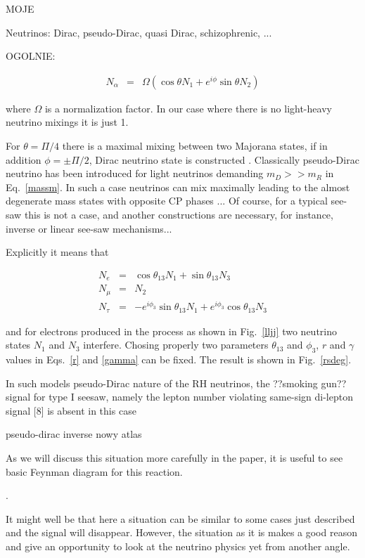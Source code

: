 \documentclass[twocolumn,superscriptaddress,showpacs,prl,nofootinbib,floatfix]{revtex4}
\begin{document}
MOJE

  Neutrinos: Dirac, pseudo-Dirac, quasi Dirac, schizophrenic, ... 
 
OGOLNIE: 
 
\begin{eqnarray}
N_\alpha &=& \Omega (\cos\theta N_1 +e^{i \phi} \sin\theta N_2 )  
\end{eqnarray} 

where $\Omega$ is a normalization factor. In our case where there is no light-heavy neutrino mixings  it is just 1.  
 
For $\theta = \Pi/4$ there is a maximal mixing between two Majorana states, if in addition $\phi = \pm \Pi/2$, Dirac neutrino state is constructed  \cite{Bilenky:1987ty}. Classically pseudo-Dirac neutrino has been introduced for light neutrinos demanding $m_D>> m_R$ in Eq.~\ref{massm}. In such a case neutrinos can mix maximally leading to the almost degenerate mass states  with opposite CP phases ...
Of course, for a typical see-saw this is not a case, and  another constructions are necessary, for instance, inverse or linear see-saw mechanisms...

Explicitly it means that

\begin{eqnarray}
N_e &=& \cos\theta_{13} N_1 +\sin\theta_{13} N_3 \\
N_\mu &=& N_2 \\
N_\tau &=& -e^{i\phi_3}\sin\theta_{13} N_1 +e^{i\phi_3}\cos\theta_{13} N_3
\end{eqnarray}

and for electrons produced in the process as shown in Fig.~\ref{lljj} two neutrino states $N_1$ and $N_3$ interfere. Chosing properly two parameters $\theta_{13}$ and $\phi_3$, $r$ and 
$\gamma$ values in Eqs.~\ref{r} and \ref{gamma} can be fixed. The result is shown in Fig.~\ref{rsdeg}.
 
In such models 
pseudo-Dirac nature of the RH
neutrinos, the ??smoking gun?? signal for type I seesaw, namely the lepton number violating
same-sign di-lepton signal [8] is absent in this case


pseudo-dirac inverse
\cite{Chen:2011hc}
\cite{Han:2006ip}
\cite{delAguila:2007em}
\cite{Mohapatra:1986aw}
nowy atlas \cite{Aad:2015xaa}

 
As we will discuss this situation more carefully in the paper, it is useful to see basic Feynman diagram for this reaction. 

.

It might well be that here a situation can be similar to some cases just described and the signal will disappear. However, the situation as it is makes a good reason and give an opportunity to look at the neutrino physics yet from another angle. 
\end{document}
